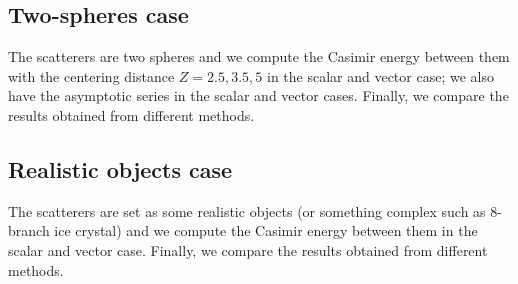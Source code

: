 \subsection{Two-spheres case}
{\color {blue} The scatterers are two spheres and we compute the Casimir energy between them with the centering distance $Z = 2.5, 3.5, 5$ in the scalar and 
vector case; we also have the asymptotic series in the scalar and vector cases. Finally, we compare the results obtained from different 
methods.} 
\subsection{Realistic objects case}
{\color {blue} The scatterers are set as some realistic objects (or something complex such as 8-branch ice crystal) and we compute the Casimir energy between them 
in the scalar and vector case. Finally, we compare the results obtained from different methods.} 
